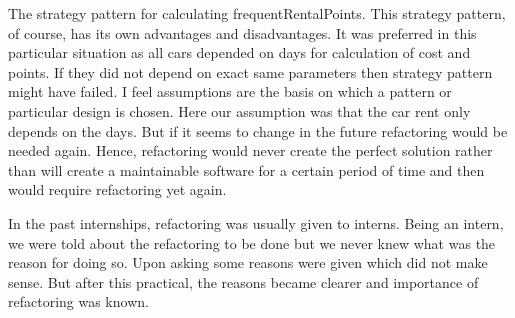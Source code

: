 The strategy pattern for calculating frequentRentalPoints. This strategy pattern, of course, has its own advantages and disadvantages. It was preferred in this particular situation as all cars depended on days for calculation of cost and points. If they did not depend on exact same parameters then strategy pattern might have failed. I feel assumptions are the basis on which a pattern or particular design is chosen. Here our assumption was that the car rent only depends on the days. But if it seems to change in the future refactoring would be needed again. Hence, refactoring would never create the perfect solution rather than will create a maintainable software for a certain period of time and then would require refactoring yet again.

In the past internships, refactoring was usually given to interns. Being an intern, we were told about the refactoring to be done but we never knew what was the reason for doing so. Upon asking some reasons were given which did not make sense. But after this practical, the reasons became clearer and importance of refactoring was known.
